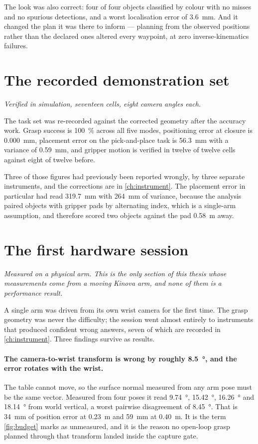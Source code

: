 The look was also correct: four of four objects classified by colour with no
misses and no spurious detections, and a worst localisation error of
\SI{3.6}{\milli\metre}. And it changed the plan it was there to inform ---
planning from the observed positions rather than the declared ones altered
every waypoint, at zero inverse-kinematics failures.

\section{The recorded demonstration set}

\emph{Verified in simulation, seventeen cells, eight camera angles each.}

The task set was re-recorded against the corrected geometry after the accuracy
work. Grasp success is \SI{100}{\percent} across all five modes, positioning
error at closure is \SI{0.000}{\milli\metre}, placement error on the
pick-and-place task is \SI{56.3}{\milli\metre} with a variance of
\SI{0.59}{\milli\metre}, and gripper motion is verified in twelve of twelve
cells against eight of twelve before.

Three of those figures had previously been reported wrongly, by three separate
instruments, and the corrections are in \cref{ch:instrument}. The placement
error in particular had read \SI{319.7}{\milli\metre} with
\SI{264}{\milli\metre} of variance, because the analysis paired objects with
gripper pads by alternating index, which is a single-arm assumption, and
therefore scored two objects against the pad \SI{0.58}{\metre} away.

\section{The first hardware session}
\label{sec:hardware-session}
\label{sec:hardware}

\emph{Measured on a physical arm. This is the only section of this thesis
whose measurements come from a moving Kinova arm, and none of them is a
performance result.}

A single arm was driven from its own wrist camera for the first time. The
grasp geometry was never the difficulty; the session went almost entirely to
instruments that produced confident wrong answers, seven of which are recorded
in \cref{ch:instrument}. Three findings survive as results.

\paragraph{The camera-to-wrist transform is wrong by roughly
\SI{8.5}{\degree}, and the error rotates with the wrist.} The table cannot
move, so the surface normal measured from any arm pose must be the same
vector. Measured from four poses it read \SI{9.74}{\degree},
\SI{15.42}{\degree}, \SI{16.26}{\degree} and \SI{18.14}{\degree} from world
vertical, a worst pairwise disagreement of \SI{8.45}{\degree}. That is
\SI{34}{\milli\metre} of position error at \SI{0.23}{\metre} and
\SI{59}{\milli\metre} at \SI{0.40}{\metre}. It is the term
\cref{fig:budget} marks as unmeasured, and it is the reason no open-loop
grasp planned through that transform landed inside the capture gate.

